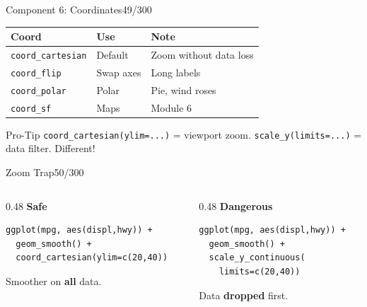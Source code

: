 \documentclass[10pt]{beamer}
\newcommand{\smark}[1]{\hfill{\scriptsize\color{codegray}#1}}
\begin{document}
\begin{frame}{Component 6: Coordinates}\smark{49/300}
\centering\small
\begin{tabular}{@{}lll@{}}
    \toprule
    \textbf{Coord} & \textbf{Use} & \textbf{Note} \\
    \midrule
    \texttt{coord\_cartesian} & Default    & Zoom without data loss \\
    \texttt{coord\_flip}      & Swap axes  & Long labels \\
    \texttt{coord\_polar}     & Polar      & Pie, wind roses \\
    \texttt{coord\_sf}        & Maps       & Module 6 \\
    \bottomrule
\end{tabular}
\vspace{0.3cm}
\begin{alertblock}{Pro-Tip}
    \scriptsize \texttt{coord\_cartesian(ylim=...)} = viewport zoom. \texttt{scale\_y(limits=...)} = data filter. Different!
\end{alertblock}
\end{frame}

\begin{frame}[fragile]{Zoom Trap}\smark{50/300}
\begin{columns}[T]
\begin{column}{0.48\textwidth}
\centering\textbf{Safe}\\[0.1cm]
\begin{lstlisting}[style=Rstyle]
ggplot(mpg, aes(displ,hwy)) +
  geom_smooth() +
  coord_cartesian(ylim=c(20,40))
\end{lstlisting}
\scriptsize Smoother on \textbf{all} data.
\end{column}
\begin{column}{0.48\textwidth}
\centering\textbf{Dangerous}\\[0.1cm]
\begin{lstlisting}[style=Rstyle]
ggplot(mpg, aes(displ,hwy)) +
  geom_smooth() +
  scale_y_continuous(
    limits=c(20,40))
\end{lstlisting}
\scriptsize Data \textbf{dropped} first.
\end{column}
\end{columns}
\end{frame}
\end{document}

